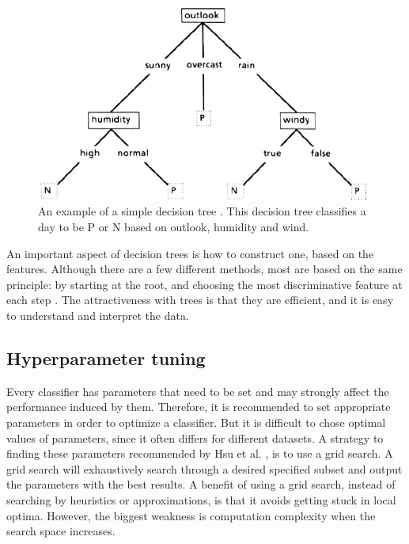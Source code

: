 \documentclass[USenglish]{ifimaster}  %
\begin{document}
	
\begin{figure}[h]
		\centering
		\includegraphics[scale=0.5]{Figures/decisionTree.PNG}
		\caption[An example of decision tree classification]{An example of a simple decision tree \cite{Quinlan1986}. This decision tree classifies a day to be P or N based on outlook, humidity and wind.}
		\label{fig:decisiontree}
\end{figure}
\FloatBarrier

An important aspect of decision trees is how to construct one, based on the features. Although there are a few different methods, most are based on the same principle: by starting at the root, and choosing the most discriminative feature at each step \cite{Marsland:2009:MLA:1571643}. The attractiveness with trees is that they are efficient, and it is easy to understand and interpret the data.

\subsection{Hyperparameter tuning}\label{sub:hypt}
Every classifier has parameters that need to be set and may strongly affect the performance induced by them. Therefore, it is recommended to set appropriate parameters in order to optimize a classifier. But it is difficult to chose optimal values of parameters, since it often differs for different datasets. A strategy to finding these parameters recommended by Hsu et al. \cite{Hsu10apractical}, is to use a grid search. A grid search will exhaustively search through a desired specified subset and output the parameters with the best results. A benefit of using a grid search, instead of searching by heuristics or approximations, is that it avoids getting stuck in local optima. However, the biggest weakness is computation complexity when the search space increases.
\end{document}
